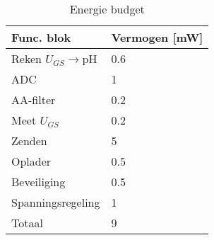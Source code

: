 \begin{table}[!htbp]
    \centering
    \begin{tabular}{l|l}
        Func. blok          & Vermogen [mW] \\
        \hline
        Reken $U_{GS}\rightarrow$pH & 0.6   \\
        ADC                 & 1             \\
        AA-filter           & 0.2           \\
        Meet $U_{GS}$       & 0.2           \\
        Zenden              & 5             \\
        Oplader             & 0.5           \\
        Beveiliging         & 0.5           \\
        Spanningsregeling   & 1             \\
        \hline
        \hline
        Totaal              & 9

    \end{tabular}
    \caption{Energie budget}
    \label{tab:energieBudgetEstimatie}
\end{table}


